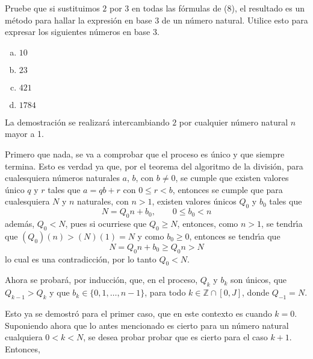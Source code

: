 \begin{enunciado}
 Pruebe que si sustituimos $2$ por $3$ en todas las f\'ormulas de (8), el resultado es un m\'etodo para hallar la expresi\'on en base $3$ de un n\'umero natural. Utilice esto para expresar los siguientes n\'umeros en base $3$.
 \begin{multicols}{4}
  \begin{enumerate}[(a)]
   \item $10$
   \item $23$
   \item $421$
   \item $1784$
  \end{enumerate}
 \end{multicols}
\end{enunciado}

\begin{solucion}
 La demostraci\'on se realizar\'a intercambiando $2$ por cualquier n\'umero natural $n$ mayor a 1.
 \par 
 Primero que nada, se va a comprobar que el proceso es \'unico y que siempre termina. Esto es verdad ya que, por el teorema del algoritmo de la divisi\'on, para cualesquiera n\'umeros naturales $a$, $b$, con $b\neq 0$, se cumple que existen valores \'unico $q$ y $r$ tales que $a = qb + r$ con $0\leq r < b$, entonces se cumple que para cualesquiera $N$ y $n$ naturales, con $n > 1$, existen valores \'unicos $Q_0$ y $b_0$ tales que 
 \begin{equation*}
  N = Q_0 n + b_0, \qquad 0 \leq b_0 < n
 \end{equation*}
 adem\'as, $Q_0 < N$, pues si ocurriese que $Q_0 \geq N$, entonces, como $n > 1$, se tendr\'{\i}a que $(Q_0)(n) > (N)(1) = N$ y como $b_0 \geq 0$, entonces se tendr\'{\i}a que
 \begin{equation*}
  N = Q_0 n + b_0 \geq Q_0 n > N
 \end{equation*}
 lo cual es una contradicci\'on, por lo tanto $Q_0 < N$.
 \par 
 Ahora se probar\'a, por inducci\'on, que, en el proceso, $Q_k$ y $b_k$ son \'unicos, que $Q_{k-1} > Q_{k}$ y que $b_k \in \{ 0, 1, \ldots, n-1 \}$, para todo $k \in \mathbb{Z}\cap[0,J]$, donde $Q_{-1} = N$. 
 \par 
 Esto ya se demostr\'o para el primer caso, que en este contexto es cuando $k=0$. Suponiendo ahora que lo antes mencionado es cierto para un n\'umero natural cualquiera $0 < k < N$, se desea probar probar que es cierto para el caso $k+1$. Entonces, 
 \par 

\end{solucion}

